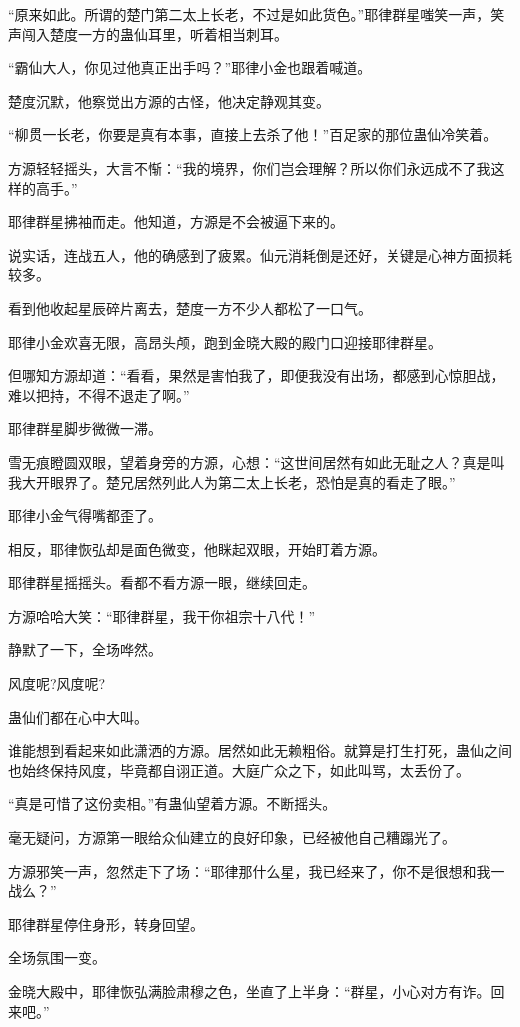 \begin{this_body}
“原来如此。所谓的楚门第二太上长老，不过是如此货色。”耶律群星嗤笑一声，笑声闯入楚度一方的蛊仙耳里，听着相当刺耳。

“霸仙大人，你见过他真正出手吗？”耶律小金也跟着喊道。

楚度沉默，他察觉出方源的古怪，他决定静观其变。

“柳贯一长老，你要是真有本事，直接上去杀了他！”百足家的那位蛊仙冷笑着。

方源轻轻摇头，大言不惭：“我的境界，你们岂会理解？所以你们永远成不了我这样的高手。”

耶律群星拂袖而走。他知道，方源是不会被逼下来的。

说实话，连战五人，他的确感到了疲累。仙元消耗倒是还好，关键是心神方面损耗较多。

看到他收起星辰碎片离去，楚度一方不少人都松了一口气。

耶律小金欢喜无限，高昂头颅，跑到金晓大殿的殿门口迎接耶律群星。

但哪知方源却道：“看看，果然是害怕我了，即便我没有出场，都感到心惊胆战，难以把持，不得不退走了啊。”

耶律群星脚步微微一滞。

雪无痕瞪圆双眼，望着身旁的方源，心想：“这世间居然有如此无耻之人？真是叫我大开眼界了。楚兄居然列此人为第二太上长老，恐怕是真的看走了眼。”

耶律小金气得嘴都歪了。

相反，耶律恢弘却是面色微变，他眯起双眼，开始盯着方源。

耶律群星摇摇头。看都不看方源一眼，继续回走。

方源哈哈大笑：“耶律群星，我干你祖宗十八代！”

静默了一下，全场哗然。

风度呢?风度呢?

蛊仙们都在心中大叫。

谁能想到看起来如此潇洒的方源。居然如此无赖粗俗。就算是打生打死，蛊仙之间也始终保持风度，毕竟都自诩正道。大庭广众之下，如此叫骂，太丢份了。

“真是可惜了这份卖相。”有蛊仙望着方源。不断摇头。

毫无疑问，方源第一眼给众仙建立的良好印象，已经被他自己糟蹋光了。

方源邪笑一声，忽然走下了场：“耶律那什么星，我已经来了，你不是很想和我一战么？”

耶律群星停住身形，转身回望。

全场氛围一变。

金晓大殿中，耶律恢弘满脸肃穆之色，坐直了上半身：“群星，小心对方有诈。回来吧。”


\end{this_body}
